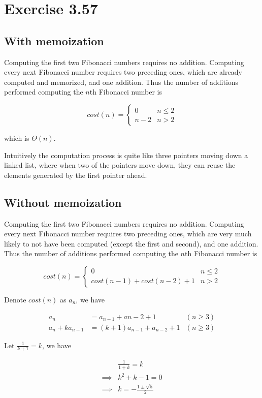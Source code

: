 \documentclass[../main.tex]{subfiles}
\begin{document}
\section{Exercise 3.57}

\subsection{With memoization}

Computing the first two Fibonacci numbers requires no addition. Computing every next Fibonacci number requires two preceding ones, which are already computed and memorized, and one addition. Thus the number of additions performed computing the $n$th Fibonacci number is

$$
cost(n) =
\begin{cases}
0 & n \le 2\\
n - 2 & n > 2
\end{cases}
$$

which is $\Theta(n)$.

Intuitively the computation process is quite like three pointers moving down a linked list, where when two of the pointers move down, they can reuse the elements generated by the first pointer ahead.

\subsection{Without memoization}

Computing the first two Fibonacci numbers requires no addition. Computing every next Fibonacci number requires two preceding ones, which are very much likely to not have been computed (except the first and second), and one addition. Thus the number of additions performed computing the $n$th Fibonacci number is

$$
cost(n) =
\begin{cases}
0 & n \le 2\\
cost(n-1) + cost(n-2) + 1 & n > 2
\end{cases}
$$

Denote $cost(n)$ as $a_n$, we have

\begin{align*}
a_n &= a_{n-1} + a{n-2} + 1 & (n \ge 3)\\
a_n + ka_{n-1} &= (k+1)a_{n-1} + a_{n-2} + 1 & (n \ge 3)
\end{align*}

Let $\frac{1}{k+1}=k$, we have

\begin{align*}
& \frac{1}{1+k} = k\\
\implies & k^2 + k - 1 = 0\\
\implies & k = -\frac{1 \pm \sqrt{5}}{2}
\end{align*}
\end{document}
